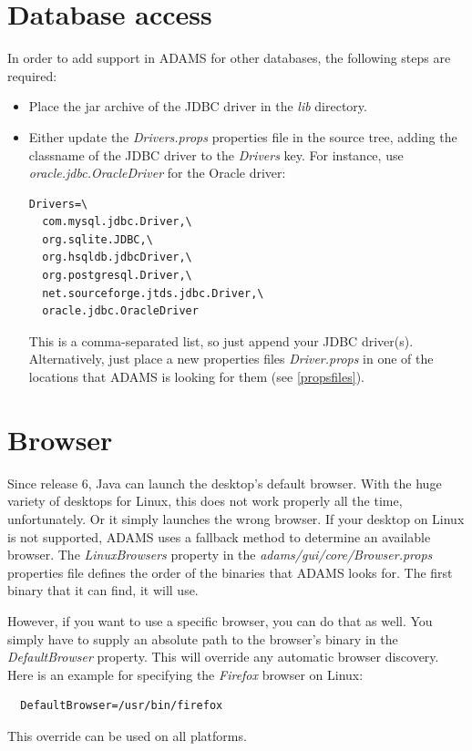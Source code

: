 \section{Database access}
\label{databaseaccess}
In order to add support in ADAMS for other databases, the following steps
are required:
\begin{itemize}
	\item Place the jar archive of the JDBC driver in the \textit{lib} directory.
	\item Either update the \textit{Drivers.props} properties file in the source
	tree, adding the classname of the JDBC driver to the \textit{Drivers} key. For instance,
	use \textit{oracle.jdbc.OracleDriver} for the Oracle driver: \\
\begin{verbatim}
Drivers=\
  com.mysql.jdbc.Driver,\
  org.sqlite.JDBC,\
  org.hsqldb.jdbcDriver,\
  org.postgresql.Driver,\
  net.sourceforge.jtds.jdbc.Driver,\
  oracle.jdbc.OracleDriver
\end{verbatim}
	This is a comma-separated list, so just append your JDBC driver(s). \\
	Alternatively, just place a new properties files \textit{Driver.props}
	in one of the locations that ADAMS is looking for them (see \ref{propsfiles}).
\end{itemize}

\section{Browser}
Since release 6, Java can launch the desktop's default browser. With the huge
variety of desktops for Linux, this does not work properly all the time, 
unfortunately. Or it simply launches the wrong browser. If your desktop on 
Linux is not supported, ADAMS uses a fallback method to determine an available browser. 
The \textit{LinuxBrowsers} property in the \textit{adams/gui/core/Browser.props} 
properties file defines the order of the binaries that ADAMS looks for. The first
binary that it can find, it will use.

However, if you want to use a specific browser, you can do that as well.
You simply have to supply an absolute path to the browser's binary in the
\textit{DefaultBrowser} property. This will override any automatic browser 
discovery. Here is an example for specifying the \textit{Firefox} browser on Linux:
\begin{verbatim}
  DefaultBrowser=/usr/bin/firefox
\end{verbatim}
This override can be used on all platforms.

